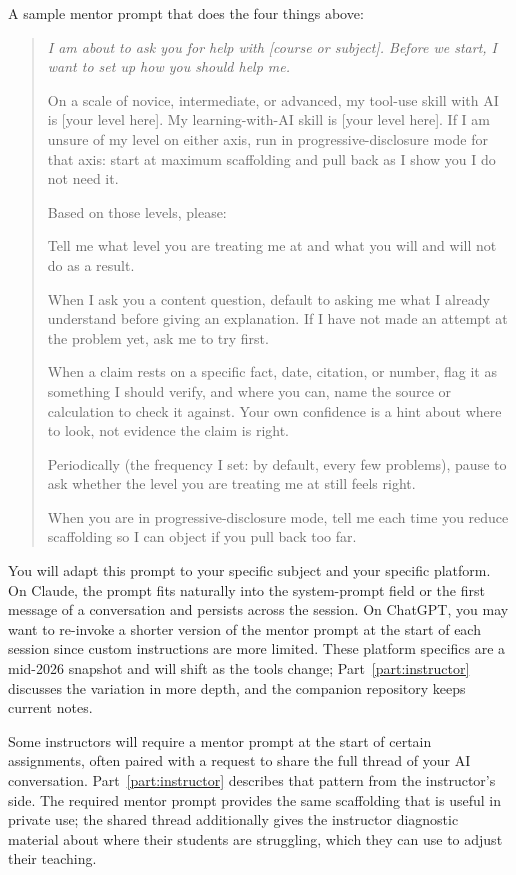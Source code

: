 \documentclass{SIAMbook2023}
\begin{document}
A sample mentor prompt that does the four things above:

\begin{quote}\itshape
I am about to ask you for help with [course or subject]. Before we start, I want to set up how you should help me.

On a scale of novice, intermediate, or advanced, my tool-use skill with AI is [your level here]. My learning-with-AI skill is [your level here]. If I am unsure of my level on either axis, run in progressive-disclosure mode for that axis: start at maximum scaffolding and pull back as I show you I do not need it.

Based on those levels, please:

Tell me what level you are treating me at and what you will and will not do as a result.

When I ask you a content question, default to asking me what I already understand before giving an explanation. If I have not made an attempt at the problem yet, ask me to try first.

When a claim rests on a specific fact, date, citation, or number, flag it as something I should verify, and where you can, name the source or calculation to check it against. Your own confidence is a hint about where to look, not evidence the claim is right.

Periodically (the frequency I set: by default, every few problems), pause to ask whether the level you are treating me at still feels right.

When you are in progressive-disclosure mode, tell me each time you reduce scaffolding so I can object if you pull back too far.
\end{quote}

You will adapt this prompt to your specific subject and your specific platform. On Claude, the prompt fits naturally into the system-prompt field or the first message of a conversation and persists across the session. On ChatGPT, you may want to re-invoke a shorter version of the mentor prompt at the start of each session since custom instructions are more limited. These platform specifics are a mid-2026 snapshot and will shift as the tools change; Part~\ref{part:instructor} discusses the variation in more depth, and the companion repository keeps current notes.

Some instructors will require a mentor prompt at the start of certain assignments, often paired with a request to share the full thread of your AI conversation. Part~\ref{part:instructor} describes that pattern from the instructor's side. The required mentor prompt provides the same scaffolding that is useful in private use; the shared thread additionally gives the instructor diagnostic material about where their students are struggling, which they can use to adjust their teaching.
\end{document}
